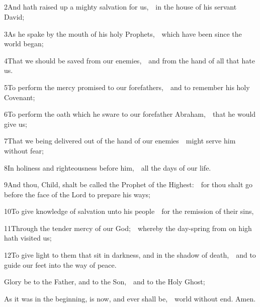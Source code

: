 \subsection{}


2\enspace And hath raised up a mighty salvation for us,\ \star\ in the house of his servant David;

3\enspace As he spake by the mouth of his holy Prophets,\ \star\ which have been since the world began;

4\enspace That we should be saved from our enemies,\ \star\ and from the hand of all that hate us.

5\enspace To perform the mercy promised to our forefathers,\ \star\ and to remember his holy Covenant;

6\enspace To perform the oath which he sware to our forefather Abraham,\ \star\ that he would give us;

7\enspace That we being delivered out of the hand of our enemies\ \star\ might serve him without fear;

8\enspace In holiness and righteousness before him,\ \star\ all the days of our life.

9\enspace And thou, Child, shalt be called the Prophet of the Highest:\ \star\ for thou shalt go before the face of the Lord to prepare his ways;

10\enspace To give knowledge of salvation unto his people\ \star\ for the remission of their sins,

11\enspace Through the tender mercy of our God;\ \star\ whereby the day-spring from on high hath visited us;

12\enspace To give light to them that sit in darkness, and in the shadow of death,\ \star\ and to guide our feet into the way of peace.

Glory be to the Father, and to the Son,\ \star\ and to the Holy Ghost;

As it was in the beginning, is now, and ever shall be,\ \star\ world without end. Amen.

\bigskip
{}



